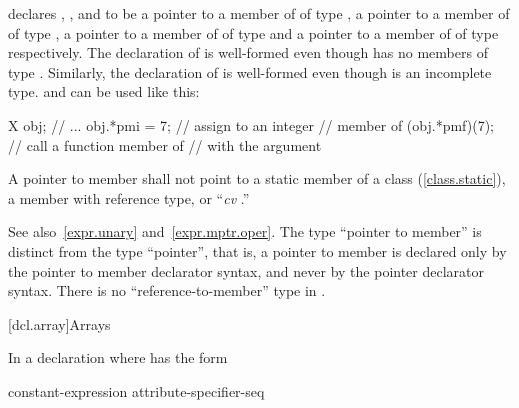 declares
,
,
and
to be a pointer to a member of
of type
,
a pointer to a member of
of type
,
a pointer to a member of
of type
and a pointer to a member of
of type
respectively.
The declaration of
is well-formed even though
has no members of type
.
Similarly, the declaration of
is well-formed even though
is an incomplete type.
and
can be used like this:

\begin{codeblock}
X obj;
// ...
obj.*pmi = 7;       // assign  to an integer
                    // member of 
(obj.*pmf)(7);      // call a function member of 
                    // with the argument 
\end{codeblock}
\exitexample

\pnum
A pointer to member shall not point to a static member
of a class (\ref{class.static}),
a member with reference type,
or
``\textit{cv}
.''

\enternote
See also~\ref{expr.unary} and~\ref{expr.mptr.oper}.
The type ``pointer to member'' is distinct from the type ``pointer'',
that is, a pointer to member is declared only by the pointer to member
declarator syntax, and never by the pointer declarator syntax.
There is no ``reference-to-member'' type in \Cpp.
\exitnote

[dcl.array]{Arrays}%

\pnum
In a declaration
where
has the form

\begin{ncsimplebnf}
\terminal{D1 [} constant-expression\opt \terminal{]} attribute-specifier-seq\opt
\end{ncsimplebnf}

